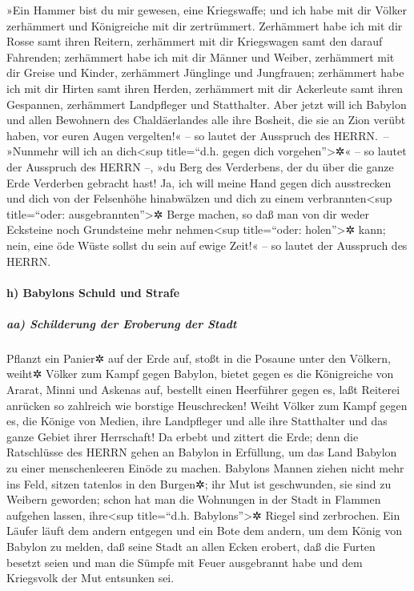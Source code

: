 »Ein Hammer bist du mir gewesen, eine Kriegswaffe; und
ich habe mit dir Völker zerhämmert und Königreiche mit dir zertrümmert.
Zerhämmert habe ich mit dir Rosse samt ihren Reitern,
zerhämmert mit dir Kriegswagen samt den darauf Fahrenden;
zerhämmert habe ich mit dir Männer und Weiber, zerhämmert
mit dir Greise und Kinder, zerhämmert Jünglinge und Jungfrauen;
zerhämmert habe ich mit dir Hirten samt ihren Herden,
zerhämmert mit dir Ackerleute samt ihren Gespannen, zerhämmert
Landpfleger und Statthalter. Aber jetzt will ich Babylon
und allen Bewohnern des Chaldäerlandes alle ihre Bosheit, die sie an
Zion verübt haben, vor euren Augen vergelten!« -- so lautet der
Ausspruch des HERRN.~-- »Nunmehr will ich an
dich\textless sup title=``d.h. gegen dich vorgehen''\textgreater✲« -- so
lautet der Ausspruch des HERRN --, »du Berg des Verderbens, der du über
die ganze Erde Verderben gebracht hast! Ja, ich will meine Hand gegen
dich ausstrecken und dich von der Felsenhöhe hinabwälzen und dich zu
einem verbrannten\textless sup title=``oder:
ausgebrannten''\textgreater✲ Berge machen, so daß man von
dir weder Ecksteine noch Grundsteine mehr nehmen\textless sup
title=``oder: holen''\textgreater✲ kann; nein, eine öde Wüste sollst du
sein auf ewige Zeit!« -- so lautet der Ausspruch des HERRN.

\hypertarget{h-babylons-schuld-und-strafe}{%
\paragraph{h) Babylons Schuld und
Strafe}\label{h-babylons-schuld-und-strafe}}

\hypertarget{aa-schilderung-der-eroberung-der-stadt}{%
\subparagraph{aa) Schilderung der Eroberung der
Stadt}\label{aa-schilderung-der-eroberung-der-stadt}}

Pflanzt ein Panier✲ auf der Erde auf, stoßt in die
Posaune unter den Völkern, weiht✲ Völker zum Kampf gegen Babylon, bietet
gegen es die Königreiche von Ararat, Minni und Askenas auf, bestellt
einen Heerführer gegen es, laßt Reiterei anrücken so zahlreich wie
borstige Heuschrecken! Weiht Völker zum Kampf gegen es,
die Könige von Medien, ihre Landpfleger und alle ihre Statthalter und
das ganze Gebiet ihrer Herrschaft! Da erbebt und zittert
die Erde; denn die Ratschlüsse des HERRN gehen an Babylon in Erfüllung,
um das Land Babylon zu einer menschenleeren Einöde zu machen.
Babylons Mannen ziehen nicht mehr ins Feld, sitzen
tatenlos in den Burgen✲; ihr Mut ist geschwunden, sie sind zu Weibern
geworden; schon hat man die Wohnungen in der Stadt in Flammen aufgehen
lassen, ihre\textless sup title=``d.h. Babylons''\textgreater✲ Riegel
sind zerbrochen. Ein Läufer läuft dem andern entgegen und
ein Bote dem andern, um dem König von Babylon zu melden, daß seine Stadt
an allen Ecken erobert, daß die Furten besetzt seien und
man die Sümpfe mit Feuer ausgebrannt habe und dem Kriegsvolk der Mut
entsunken sei.

